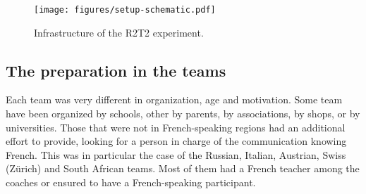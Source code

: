 \documentclass{intech-journal}
\begin{document}
\begin{figure}[ht]
 \centering
    \texttt{[image: figures/setup-schematic.pdf]}
  \caption{Infrastructure of the R2T2 experiment.}
  \label{fig:setup-scheme} 
\end{figure}

\subsection{The preparation in the teams}

Each team was very different in organization, age and motivation.
Some team have been organized by schools, other by parents, by associations, by shops, or by universities. 
Those that were not in French-speaking regions had an additional effort to provide, looking for a person in charge of the communication knowing French. 
This was in particular the case of the Russian, Italian, Austrian, Swiss (Z\"urich) and South African teams. 
Most of them had a French teacher among the coaches or ensured to have a French-speaking participant. 
\end{document}
